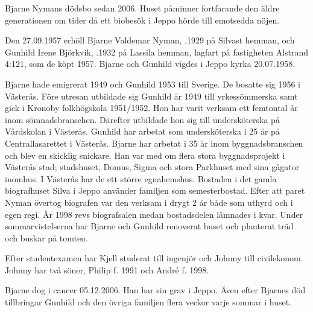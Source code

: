 
Bjarne Nymans dödsbo sedan 2006. Huset påminner fortfarande den äldre generationen om tider då ett biobesök i Jeppo hörde till emotsedda nöjen.

Den 27.09.1957 erhöll Bjarne Valdemar Nyman, .1929 på Silvast hemman, och Gunhild Irene Björkvik, .1932 på Lassila hemman, lagfart på fastigheten Alstrand 4:121, som de köpt 1957. Bjarne och Gunhild vigdes i Jeppo kyrka 20.07.1958.

Bjarne	hade emigrerat 1949 och Gunhild 1953 till Sverige. De	bosatte sig 1956 i Västerås. Före utresan utbildade sig Gunhild år 1949 till yrkessömmerska samt gick i Kronoby folkhögskola 1951/1952. Hon har varit verksam ett femtontal 		år inom sömnadsbranschen. Därefter utbildade hon sig till	undersköterska på Vårdskolan i Västerås. Gunhild har arbetat som undersköterska i 25 år på Centrallasarettet i	Västerås. Bjarne har arbetat i 35 år inom byggnadsbranschen	och blev en skicklig snickare. Han var med om flera stora	byggnadsprojekt i Västerås stad; stadshuset, Domus, Sigma	och stora Parkhuset med sina gågator inomhus. I Västerås har de ett större egnahemshus.
Bostaden i det gamla biografhuset Silva i Jeppo använder familjen som semesterbostad. Efter att paret Nyman övertog		biografen var den verksam i drygt 2 år både som uthyrd och i egen regi. År 1998 revs biografsalen medan bostadsdelen 		lämnades i kvar. Under sommarvistelserna har Bjarne och Gunhild renoverat huset och planterat träd och buskar på		tomten.
\begin{jhchildren}
  \item {}
  \item {}
\end{jhchildren}
Efter studentexamen har Kjell studerat till ingenjör och Johnny till civilekonom. Johnny har två söner, Philip f. 1991 och André f. 1998.

Bjarne dog i cancer 05.12.2006. Han har sin grav i Jeppo. Även efter Bjarnes död tillbringar Gunhild och den övriga		familjen flera veckor varje sommar i huset.


